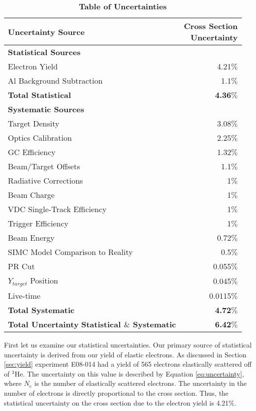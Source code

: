 \begin{table}[!h]
\centering
\begin{tabular}{|l | r |}
\hline
\textbf{Uncertainty Source} & \makecell{\textbf{Cross Section}\\ \textbf{Uncertainty}} \\
\hline
\textbf{Statistical Sources} &  \\ 
\hline
Electron Yield & 4.21$\%$\\
Al Background Subtraction & 1.1$\%$\\
\textbf{Total Statistical} &  \textbf{4.36$\%$}\\
\hline
\textbf{Systematic Sources} &  \\
\hline
Target Density & 3.08$\%$\\
Optics Calibration & 2.25$\%$\\%
GC Efficiency & 1.32$\%$\\
Beam/Target Offsets & 1.1$\%$\\
Radiative Corrections & 1$\%$\\
Beam Charge & 1$\%$\\
VDC Single-Track Efficiency & 1$\%$\\
Trigger Efficiency & 1$\%$\\
Beam Energy & 0.72$\%$\\
SIMC Model Comparison to Reality & 0.5$\%$\\
PR Cut & 0.055$\%$\\ 
$Y_{target}$ Position & 0.045$\%$\\
Live-time & 0.0115$\%$\\%
\textbf{Total Systematic} &  \textbf{4.72$\%$}\\
\hline
\makecell{\textbf{Total Uncertainty}\\ \textbf{Statistical $\&$ Systematic}} &  \textbf{6.42$\%$}\\
\hline
\end{tabular}
\caption[Table of Uncertainties]{{\bf{Table of Uncertainties}} }
\label{tab:uncertainty}
\end{table}

First let us examine our statistical uncertainties. Our primary source of statistical uncertainty is derived from our yield of elastic electrons. As discussed in Section \ref{sec:yield} experiment E08-014 had a yield of 565 electrons elastically scattered off of $^3$He. The uncertainty on this value is described by Equation \ref{eq:uncertainty}, where $N_e$ is the number of elastically scattered electrons. The uncertainty in the number of electrons is directly proportional to the cross section. Thus, the statistical uncertainty on the cross section due to the electron yield is 4.21$\%$.

